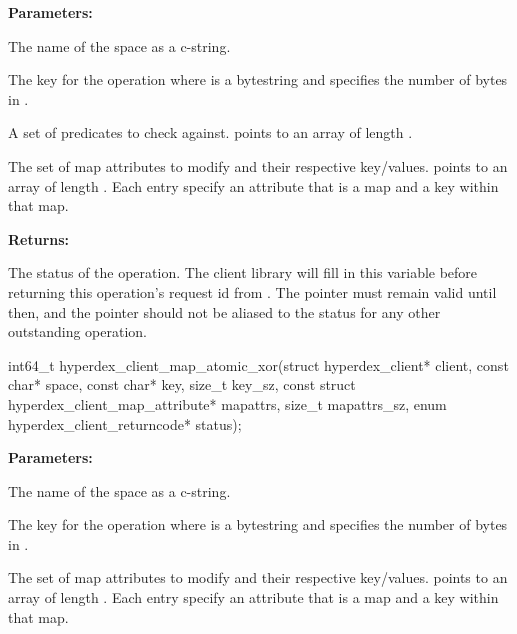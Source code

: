 \noindent\textbf{Parameters:}
\begin{description}[labelindent=\widthof{{\code{mapattrs}, \code{mapattrs\_sz}}},leftmargin=*,noitemsep,nolistsep,align=right]
\item[\code{space}] The name of the space as a c-string.
\item[\code{key}, \code{key\_sz}] The key for the operation where  is a bytestring and  specifies the number of bytes in .
\item[\code{checks}, \code{checks\_sz}] A set of predicates to check against.   points to an array of length .
\item[\code{mapattrs}, \code{mapattrs\_sz}] The set of map attributes to modify and their respective key/values.   points to an array of length .  Each entry specify an attribute that is a map and a key within that map.
\end{description}

\noindent\textbf{Returns:}
\begin{description}[labelindent=\widthof{{\code{status}}},leftmargin=*,noitemsep,nolistsep,align=right]
\item[\code{status}] The status of the operation.  The client library will fill in this variable before returning this operation's request id from .  The pointer must remain valid until then, and the pointer should not be aliased to the status for any other outstanding operation.
\end{description}

\funcsep
{}
\begin{ccode}
int64_t hyperdex_client_map_atomic_xor(struct hyperdex_client* client,
                const char* space,
                const char* key, size_t key_sz,
                const struct hyperdex_client_map_attribute* mapattrs, size_t mapattrs_sz,
                enum hyperdex_client_returncode* status);
\end{ccode}
\funcdesc 

\noindent\textbf{Parameters:}
\begin{description}[labelindent=\widthof{{\code{mapattrs}, \code{mapattrs\_sz}}},leftmargin=*,noitemsep,nolistsep,align=right]
\item[\code{space}] The name of the space as a c-string.
\item[\code{key}, \code{key\_sz}] The key for the operation where  is a bytestring and  specifies the number of bytes in .
\item[\code{mapattrs}, \code{mapattrs\_sz}] The set of map attributes to modify and their respective key/values.   points to an array of length .  Each entry specify an attribute that is a map and a key within that map.
\end{description}

